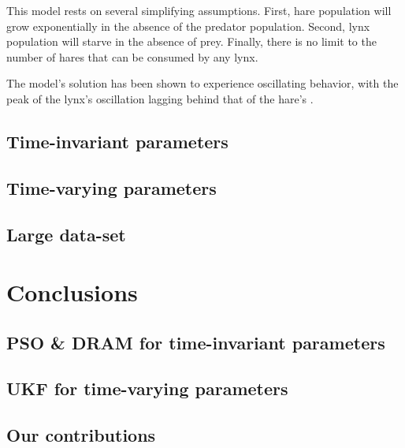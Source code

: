 \documentclass[review]{elsarticle}
\begin{document}
This model rests on several simplifying assumptions. First, hare population will grow exponentially in the absence of the predator population. Second, lynx population will starve in the absence of prey. Finally, there is no limit to the number of hares that can be consumed by any lynx.

The model's solution has been shown to experience oscillating behavior, with the peak of the lynx's oscillation lagging behind that of the hare's \cite{Lotka,Volterra}.


\subsection{Time-invariant parameters}
\subsection{Time-varying parameters}
\subsection{Large data-set}

\section{Conclusions}
\subsection{PSO \& DRAM for time-invariant parameters}
\subsection{UKF for time-varying parameters}
\subsection{Our contributions}
\end{document}
